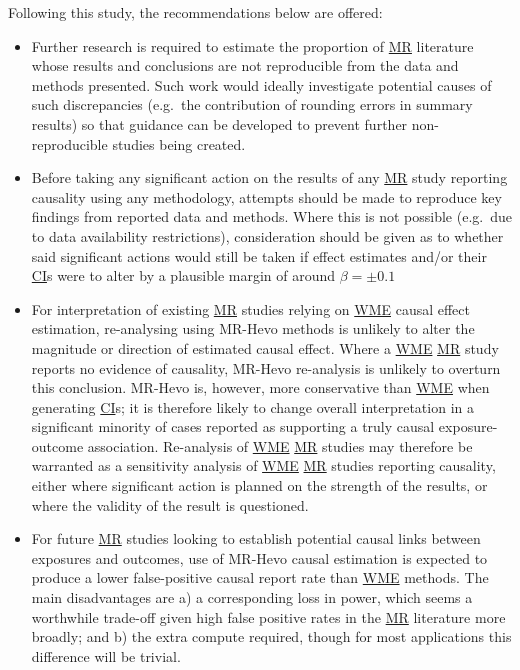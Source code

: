 \documentclass[
]{article}
\begin{document}
Following this study, the recommendations below are offered:

\begin{itemize}
\item
  Further research is required to estimate the proportion of \hyperref[acronyms_MR]{MR} literature whose results and conclusions are not reproducible from the data and methods presented. Such work would ideally investigate potential causes of such discrepancies (e.g.~the contribution of rounding errors in summary results) so that guidance can be developed to prevent further non-reproducible studies being created.
\item
  Before taking any significant action on the results of any \hyperref[acronyms_MR]{MR} study reporting causality using any methodology, attempts should be made to reproduce key findings from reported data and methods. Where this is not possible (e.g.~due to data availability restrictions), consideration should be given as to whether said significant actions would still be taken if effect estimates and/or their \hyperref[acronyms_CI]{CI}s were to alter by a plausible margin of around \(\beta = \pm 0.1\)
\item
  For interpretation of existing \hyperref[acronyms_MR]{MR} studies relying on \hyperref[acronyms_WME]{WME} causal effect estimation, re-analysing using MR-Hevo methods is unlikely to alter the magnitude or direction of estimated causal effect. Where a \hyperref[acronyms_WME]{WME} \hyperref[acronyms_MR]{MR} study reports no evidence of causality, MR-Hevo re-analysis is unlikely to overturn this conclusion. MR-Hevo is, however, more conservative than \hyperref[acronyms_WME]{WME} when generating \hyperref[acronyms_CI]{CI}s; it is therefore likely to change overall interpretation in a significant minority of cases reported as supporting a truly causal exposure-outcome association. Re-analysis of \hyperref[acronyms_WME]{WME} \hyperref[acronyms_MR]{MR} studies may therefore be warranted as a sensitivity analysis of \hyperref[acronyms_WME]{WME} \hyperref[acronyms_MR]{MR} studies reporting causality, either where significant action is planned on the strength of the results, or where the validity of the result is questioned.
\item
  For future \hyperref[acronyms_MR]{MR} studies looking to establish potential causal links between exposures and outcomes, use of MR-Hevo causal estimation is expected to produce a lower false-positive causal report rate than \hyperref[acronyms_WME]{WME} methods. The main disadvantages are a) a corresponding loss in power, which seems a worthwhile trade-off given high false positive rates in the \hyperref[acronyms_MR]{MR} literature more broadly; and b) the extra compute required, though for most applications this difference will be trivial.
\end{itemize}
\end{document}
